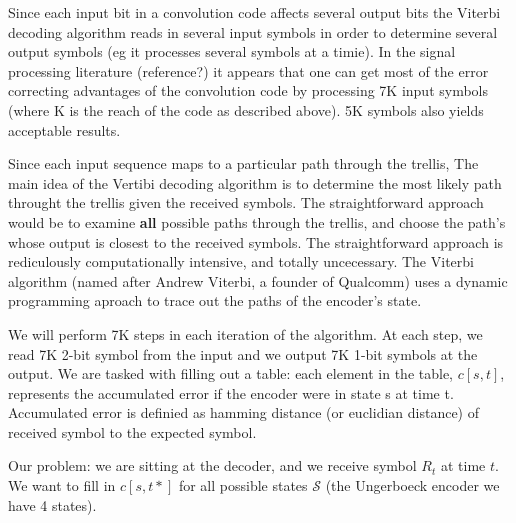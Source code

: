 \documentclass{article}
\begin{document}
Since each input bit in a convolution code affects several output bits
the Viterbi decoding algorithm reads in several input symbols in order to determine
several output symbols (eg it processes several symbols at a timie). In the
signal processing literature (reference?) it appears that one can get most
of the error correcting advantages of the convolution code by processing 7K input symbols
(where K is the reach of the code as described above). 5K symbols also yields
acceptable results.

Since each input sequence maps to a particular path through the trellis,
The main idea of the Vertibi decoding algorithm is to determine the most
likely path throught the trellis given the received symbols. The straightforward
approach would be to examine \textbf{all} possible paths through the trellis, and
choose the path's whose output is closest to the received symbols. The
straightforward approach is rediculously computationally intensive, 
and totally uncecessary. The Viterbi algorithm (named after Andrew Viterbi, a founder of Qualcomm)
uses a dynamic programming aproach to trace out the paths of the encoder's state. 

We will perform 7K steps in each iteration of the algorithm. 
At each step, we read 7K 2-bit symbol
from the input and we output 7K 1-bit symbols at the output. 
We are tasked with filling out a table: each element in the table, $c[s,t]$, 
represents the accumulated error if the encoder were in state s at time t. 
Accumulated error is definied as hamming distance
(or euclidian distance) of received symbol to the expected symbol.

Our problem: we are sitting at the decoder, and we receive symbol $R_t$ at time $t$. We want to fill in 
$c[s,t*]$ for all possible states $\mathcal{S}$ (the Ungerboeck encoder we have 4 states).
\end{document}
